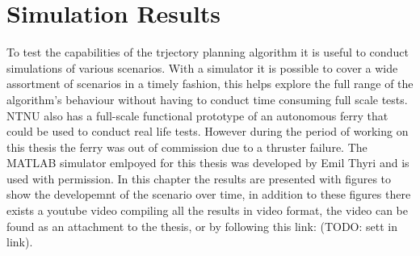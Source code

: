 \section{Simulation Results}


To test the capabilities of the trjectory planning algorithm it is useful to conduct simulations of various scenarios.
With a simulator it is possible to cover a wide assortment of scenarios in a timely fashion, this helps explore the full
range of the algorithm's behaviour without having to conduct time consuming full scale tests. NTNU also has a full-scale
functional prototype of an autonomous ferry that could be used to conduct real life tests. However during the period of working
on this thesis the ferry was out of commission due to a thruster failure.
The MATLAB simulator emlpoyed for this thesis was developed by Emil Thyri and is used with permission. In this chapter the results
are presented with figures to show the developemnt of the scenario over time, in addition to these figures there exists a youtube video compiling
all the results in video format, the video can be found as an attachment to the thesis, or by following this link: (TODO: sett in link).

